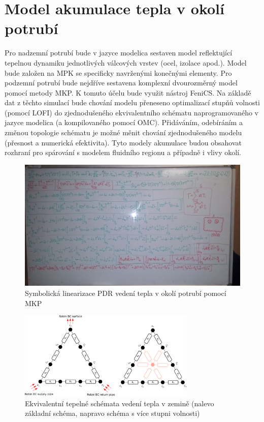 \section{Model akumulace tepla v okolí potrubí}
\label{sec:PipeAcu}
Pro nadzemní potrubí bude v jazyce modelica sestaven model reflektující
tepelnou dynamiku jednotlivých válcových vrstev (ocel, izolace apod.). Model
bude založen na MPK se specificky navrženými konečnými elementy. Pro
podzemní potrubí bude nejdříve sestavena komplexní dvourozměrný model pomocí
metody MKP. K tomuto účelu bude využit nástroj FeniCS. Na základě dat z těchto
simulací bude chování modelu přeneseno optimalizací stupňů volnosti (pomocí
LOFI) do zjednodušeného ekvivalentního schématu naprogramovaného v jazyce
modelica (a kompilovaného pomocí OMC). Přidáváním, odebíráním a změnou
topologie schématu je možné měnit chování zjednodušeného modelu (přesnost a
numerická efektivita). Tyto modely akumulace budou obsahovat rozhraní pro
spárování s modelem fluidního regionu a případně i vlivy okolí. 
\begin{figure}[h]
\begin{center}
  \includegraphics[scale=0.09]{figures/Assembly_TimeDependent}
\end{center}
\caption{Symbolická linearizace PDR vedení tepla v okolí potrubí pomocí MKP}
\label{fig:VariationalMathTwoPipes}
\end{figure}
\begin{figure}[h]
  \centering
    \includegraphics[width=0.75\textwidth]{figures/acumulation_burried}
    \caption{Ekvivalentní tepelné schémata vedení tepla v zemině (nalevo
      základní schéma, napravo schéma s více stupni volnosti)}
    \label{fig:above_ground_pipe}
\end{figure}
